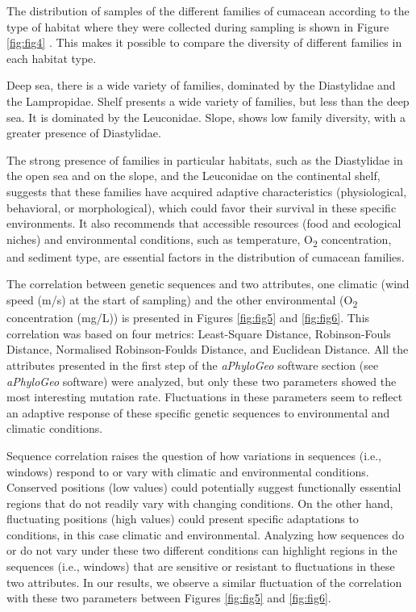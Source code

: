 The distribution of samples of the different families of cumacean according to the type of habitat where they were collected during sampling is shown in Figure \ref{fig:fig4} . This makes it possible to compare the diversity of different families in each habitat type.

Deep sea, there is a wide variety of families, dominated by the Diastylidae and the Lampropidae. Shelf presents a wide variety of families, but less than the deep sea. It is dominated by the Leuconidae. Slope, shows low family diversity, with a greater presence of Diastylidae. 

The strong presence of families in particular habitats, such as the Diastylidae in the open sea and on the slope, and the Leuconidae on the continental shelf, suggests that these families have acquired adaptive characteristics (physiological, behavioral, or morphological), which could favor their survival in these specific environments. It also recommends that accessible resources (food and ecological niches) and environmental conditions, such as temperature, O\textsubscript{2} concentration, and sediment type, are essential factors in the distribution of cumacean families.

The correlation between genetic sequences and two attributes, one climatic (wind speed (m/s) at the start of sampling) and the other environmental (O\textsubscript{2}  concentration (mg/L)) is presented in Figures \ref{fig:fig5} and \ref{fig:fig6}. This correlation was based on four metrics: Least-Square Distance, Robinson-Fouls Distance, Normalised Robinson-Foulds Distance, and Euclidean Distance.  All the attributes presented in the first step of the \textit{aPhyloGeo} software section (see \textit{aPhyloGeo} software) were analyzed, but only these two parameters showed the most interesting mutation rate. Fluctuations in these parameters seem to reflect an adaptive response of these specific genetic sequences to environmental and climatic conditions. 

Sequence correlation raises the question of how variations in sequences (i.e., windows) respond to or vary with climatic and environmental conditions. Conserved positions (low values) could potentially suggest functionally essential regions that do not readily vary with changing conditions. On the other hand, fluctuating positions (high values) could present specific adaptations to conditions, in this case climatic and environmental. Analyzing how sequences do or do not vary under these two different conditions can highlight regions in the sequences (i.e., windows) that are sensitive or resistant to fluctuations in these two attributes. In our results, we observe a similar fluctuation of the correlation with these two parameters between Figures \ref{fig:fig5} and \ref{fig:fig6}.

